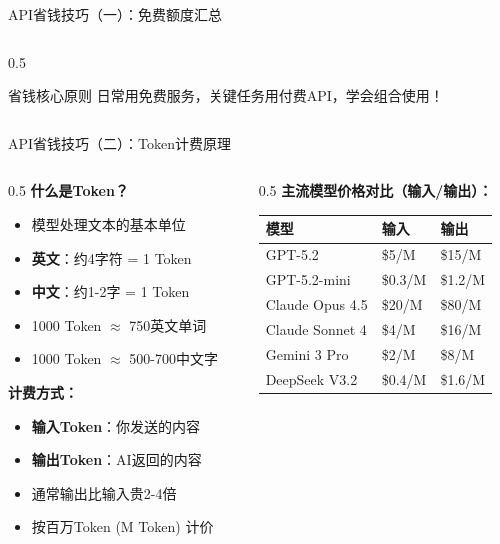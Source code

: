 \documentclass[aspectratio=169,11pt]{beamer}
\begin{document}
\begin{frame}{API省钱技巧（一）：免费额度汇总}
\begin{columns}
\begin{column}{0.5\textwidth}
            \vspace{0.3cm}
            \begin{alertblock}{省钱核心原则}
                \small
                日常用免费服务，关键任务用付费API，学会组合使用！
            \end{alertblock}
        \end{column}
    \end{columns}
\end{frame}

\begin{frame}{API省钱技巧（二）：Token计费原理}
    \begin{columns}
        \begin{column}{0.5\textwidth}
            \textbf{什么是Token？}
            \begin{itemize}
                \item 模型处理文本的基本单位
                \item \textbf{英文}：约4字符 = 1 Token
                \item \textbf{中文}：约1-2字 = 1 Token
                \item 1000 Token $\approx$ 750英文单词
                \item 1000 Token $\approx$ 500-700中文字
            \end{itemize}
            
            \vspace{0.3cm}
            \textbf{计费方式：}
            \begin{itemize}
                \item \textbf{输入Token}：你发送的内容
                \item \textbf{输出Token}：AI返回的内容
                \item 通常输出比输入贵2-4倍
                \item 按百万Token (M Token) 计价
            \end{itemize}
        \end{column}
        \begin{column}{0.5\textwidth}
            \textbf{主流模型价格对比（输入/输出）：}
            \footnotesize
            \begin{tabular}{lll}
                \toprule
                \textbf{模型} & \textbf{输入} & \textbf{输出} \\
                \midrule
                GPT-5.2 & \$5/M & \$15/M \\
                GPT-5.2-mini & \$0.3/M & \$1.2/M \\
                Claude Opus 4.5 & \$20/M & \$80/M \\
                Claude Sonnet 4 & \$4/M & \$16/M \\
                Gemini 3 Pro & \$2/M & \$8/M \\
                DeepSeek V3.2 & \textcolor{green!60!black}{\$0.4/M} & \textcolor{green!60!black}{\$1.6/M} \\
                \bottomrule
            \end{tabular}
            \normalsize
            

\end{column}
\end{columns}
\end{frame}
\end{document}
